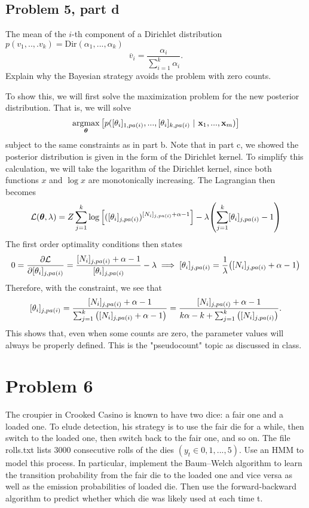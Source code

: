 \newpage
\subsection{Problem 5, part d}
The mean of the $i$-th component of a Dirichlet distribution $p(v_1, ..,. v_k) = \text{Dir}(\alpha_1, ..., \alpha_k)$
\[\overline{v}_i = \frac{\alpha_i}{\sum_{i = 1}^k \alpha_i}.\]
Explain why the Bayesian strategy avoids the problem with zero counts. 
\partbreak
\begin{solution}

    To show this, we will first solve the maximization problem for the new posterior distribution. That is, we will solve
    \[\operatorname*{argmax}_{\boldsymbol{\theta}}\qty[p([\theta_i]_{1, pa(i)}, ..., [\theta_i]_{k, pa(i)} \ | \ \textbf{x}_1, ..., \textbf{x}_m)  ]\]
    subject to the same constraints as in part b. Note that in part c, we showed the posterior distribution is given in the form of the Dirichlet kernel. To simplify this calculation, we will take the logarithm of the Dirichlet kernel, since both functions $x$ and $\log x$ are monotonically increasing. The Lagrangian then becomes
    \[\mathcal{L}(\boldsymbol{\theta}, \mathrm{\lambda}) = Z\sum_{j = 1}^k \log\qty[([\theta_i]_{j, pa(i)})^{[N_i]_{j, pa(i)} + \alpha - 1}] - \mathrm{\lambda}\qty(\sum_{j = 1}^k [\theta_i]_{j, pa(i)} - 1)\]
    The first order optimality conditions then states
    \[0 = \frac{\partial \mathcal{L}}{\partial [\theta_i]_{j, pa(i)}} = \frac{[N_i]_{j, pa(i)} + \alpha - 1}{[\theta_i]_{j, pa(i)}} - \mathrm{\lambda} \implies [\theta_i]_{j, pa(i)} = \frac{1}{\mathrm{\lambda}}\qty([N_i]_{j, pa(i)} + \alpha - 1)\]
    Therefore, with the constraint, we see that
    \[[\theta_i]_{j, pa(i)} = \frac{[N_i]_{j, pa(i)} + \alpha - 1}{\sum_{j = 1}^k\qty([N_i]_{j, pa(i)} + \alpha -1)} = \frac{[N_i]_{j, pa(i)} + \alpha - 1}{k\alpha - k + \sum_{j = 1}^k\qty([N_i]_{j, pa(i)})}.\]
    This shows that, even when some counts are zero, the parameter values will always be properly defined. This is the "pseudocount" topic as discussed in class. 
\end{solution}

\newpage
\section{Problem 6}
The croupier in Crooked Casino is known to have two dice: a fair one and a loaded one. To elude detection, his strategy is to use the fair die for a while, then switch to the loaded one, then switch back to the fair one, and so on. The file rolls.txt lists 3000 consecutive rolls of the dies $(y_t \in {0, 1,..., 5})$. Use an HMM to model this process. In particular, implement the Baum–Welch algorithm to learn the transition probability from the fair die to the loaded one and vice versa as well as the emission probabilities of loaded die. Then use the forward-backward algorithm to predict whether which die was likely used at each time t. 

